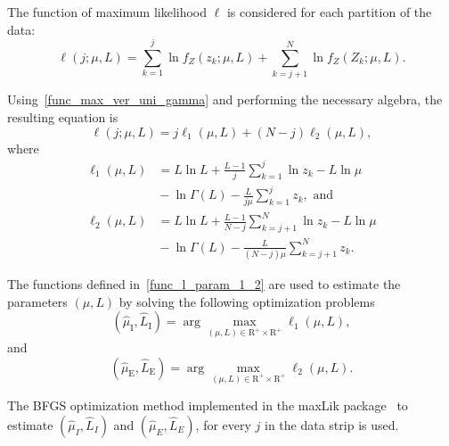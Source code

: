 \documentclass[journal]{IEEEtran}
\begin{document}
The function of maximum likelihood $\ell$ is considered for each partition of the data:
\begin{equation}\nonumber
\ell(j;\mu, L)=\sum_{k=1}^{j}\ln f_{Z}(z_k;\mu,L)
             +\sum_{k=j+1}^{N}\ln f_{Z}(Z_k;\mu,L).
\end{equation}
 
Using~\eqref{func_max_ver_uni_gamma} and performing the necessary algebra, the resulting equation is 
\begin{equation}\label{func_l_param}
  \ell(j;\mu, L)=j\ell_1(\mu, L) + (N - j)\ell_2(\mu, L),
 \end{equation}
where
\begin{equation}\label{func_l_param_1_2}
\begin{split}
    \ell_1(\mu, L)&=L\ln L+\frac{L-1}{j}\sum_{k=1}^{j}\ln z_k-L\ln\mu\\
    &{}-\ln\Gamma(L) -\frac{L}{j\mu}\sum_{k=1}^{j} z_k,\text{ and}\\
    \ell_2(\mu, L)&=L\ln L+\frac{L-1}{N-j}\sum_{k=j+1}^{N}\ln z_k-L\ln\mu\\
    &{}-\ln\Gamma(L) -\frac{L}{(N-j)\mu}\sum_{k=j+1}^{N} z_k.
 \end{split}
\end{equation}
 
The functions defined in~\eqref{func_l_param_1_2} are used to estimate the parameters $(\mu, L)$ by solving the following optimization problems 
\begin{equation}\label{optimiz_l_1}
(\widehat{\mu}_\text{I},\widehat{L}_\text{I})= \arg\max\limits_{(\mu,L)\in \mathrm{R}^{+}\times\mathrm{R}^{+}}\ell_1(\mu,L),
\end{equation}
and
\begin{equation}\label{optimiz_l_2}
(\widehat{\mu}_\text{E},\widehat{L}_\text{E})= \arg\max\limits_{(\mu,L)\in \mathrm{R}^{+}\times\mathrm{R}^{+}}\ell_2(\mu,L).
\end{equation} 

The BFGS optimization method implemented in the maxLik package~\cite{ht} to estimate $(\widehat{\mu}_I, \widehat{L}_I)$ and $(\widehat{\mu}_E, \widehat{L}_E)$, for every $j$ in the data strip is used.
\end{document}
